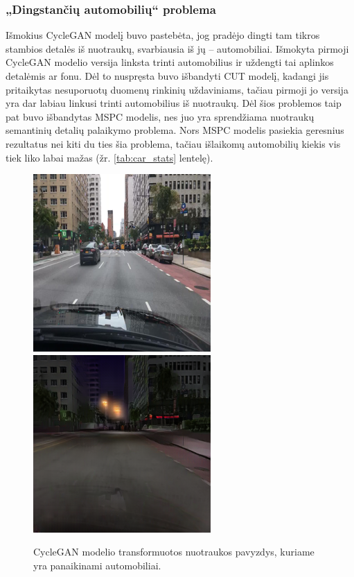\documentclass{VUMIFPSbakalaurinis}
\begin{document}
        \subsubsection{„Dingstančių automobilių“ problema}
            Išmokius CycleGAN modelį buvo pastebėta, jog pradėjo dingti tam tikros stambios detalės iš nuotraukų, svarbiausia iš jų – automobiliai. Išmokyta pirmoji CycleGAN modelio versija linksta trinti automobilius ir uždengti tai aplinkos detalėmis ar fonu. Dėl to nuspręsta buvo išbandyti CUT modelį, kadangi jis pritaikytas nesuporuotų duomenų rinkinių uždaviniams, tačiau pirmoji jo versija yra dar labiau linkusi trinti automobilius iš nuotraukų. Dėl šios problemos taip pat buvo išbandytas MSPC modelis, nes juo yra sprendžiama nuotraukų semantinių detalių palaikymo problema. Nors MSPC modelis pasiekia geresnius rezultatus nei kiti du ties šia problema, tačiau išlaikomų automobilių kiekis vis tiek liko labai mažas (žr. \ref{tab:car_stats} lentelę).
            \begin{figure}[H]
                \centering
                \includegraphics[scale=0.8]{img/CycleGANV1/1_real_B}
                \includegraphics[scale=0.8]{img/CycleGANV1/1_fake_A}
                \captionsetup{width=.8\linewidth}
                \caption{CycleGAN modelio transformuotos nuotraukos pavyzdys, kuriame yra panaikinami automobiliai.}
                \label{img:mlp}
            \end{figure}
\end{document}
